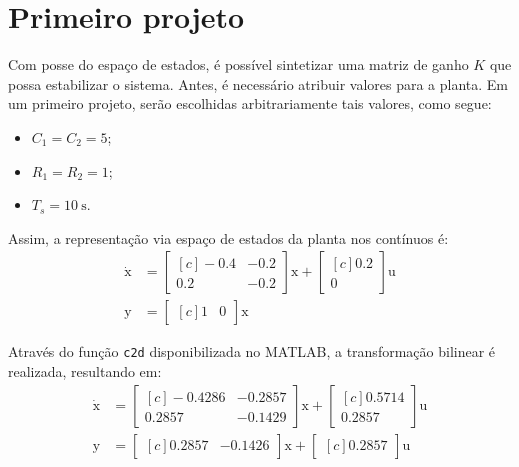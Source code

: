 \section{Primeiro projeto}
Com posse do espaço de estados, é possível sintetizar uma matriz de ganho $K$ que possa estabilizar o sistema. Antes, é necessário atribuir valores para a planta. Em um primeiro projeto, serão escolhidas arbitrariamente tais valores, como segue:
\begin{itemize}
  \item $C_1 = C_2 = 5$;
  \item $R_1 = R_2 = 1$;
  \item $T_s = \SI{10}{\second}$.
\end{itemize}

Assim, a representação via espaço de estados da planta nos contínuos é:
\begin{subequations}
  \begin{align}
    \dot{\pmb{\mathrm{x}}} &= \begin{bmatrix*}[c]
      -0.4 & -0.2\\
      0.2 & -0.2
    \end{bmatrix*}\pmb{\mathrm{x}} + \begin{bmatrix*}[c]
      0.2\\
      0
    \end{bmatrix*}\pmb{\mathrm{u}}\label{eq:SSCTCEntrada}\\
    \pmb{\mathrm{y}} &= \begin{bmatrix*}[c]
      1 & 0
    \end{bmatrix*}\pmb{\mathrm{x}}\label{eq:SSCTCSaida}
  \end{align}
\end{subequations}

Através do função \texttt{c2d} disponibilizada no MATLAB, a transformação bilinear é realizada, resultando em:
\begin{subequations}
  \begin{align}
    \dot{\pmb{\mathrm{x}}} &= \begin{bmatrix*}[c]
      -0.4286 & -0.2857\\
      0.2857 & -0.1429
    \end{bmatrix*}\pmb{\mathrm{x}} + \begin{bmatrix*}[c]
      0.5714\\
      0.2857
    \end{bmatrix*}\pmb{\mathrm{u}}\label{eq:SSDTCEntrada}\\
    \pmb{\mathrm{y}} &= \begin{bmatrix*}[c]
      0.2857 & -0.1426
    \end{bmatrix*}\pmb{\mathrm{x}} + \begin{bmatrix*}[c]
      0.2857
    \end{bmatrix*}\pmb{\mathrm{u}}\label{eq:SSDTCSaida}
  \end{align}
\end{subequations}

